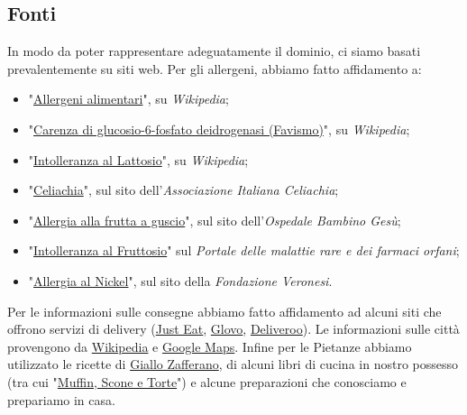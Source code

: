 \documentclass[12pt]{article}
\begin{document}
\subsection{Fonti}
In modo da poter rappresentare adeguatamente il dominio, ci siamo basati prevalentemente su siti web.\newline
Per gli allergeni, abbiamo fatto affidamento a:
\begin{itemize}
    \item "\href{https://it.wikipedia.org/wiki/Allergeni_alimentari}{Allergeni alimentari}", su \textit{Wikipedia};
    \item "\href{https://it.wikipedia.org/wiki/Carenza_di_glucosio-6-fosfato_deidrogenasi}{Carenza di glucosio-6-fosfato deidrogenasi (Favismo)}", su \textit{Wikipedia};
    \item "\href{https://it.wikipedia.org/wiki/Intolleranza_al_lattosio}{Intolleranza al Lattosio}", su \textit{Wikipedia};
    \item "\href{https://www.celiachia.it/}{Celiachia}", sul sito dell'\textit{Associazione Italiana Celiachia};
    \item "\href{http://www.ospedalebambinogesu.it/allergia-alla-frutta-a-guscio}{Allergia alla frutta a guscio}", sul sito dell'\textit{Ospedale Bambino Gesù};
    \item "\href{https://www.orpha.net/consor/cgi-bin/OC_Exp.php?lng=it&Expert=469}{Intolleranza al Fruttosio}" sul \textit{Portale delle malattie rare e dei farmaci orfani};
    \item "\href{https://www.fondazioneveronesi.it/magazine/articoli/lesperto-risponde/allergia-al-nichel-quali-precauzioni-prendere-cucina}{Allergia al Nickel}", sul sito della \textit{Fondazione Veronesi}.
\end{itemize}
Per le informazioni sulle consegne abbiamo fatto affidamento ad alcuni siti che offrono servizi di delivery (\href{https://www.justeat.it/}{Just Eat}, \href{https://glovoapp.com}{Glovo}, \href{https://deliveroo.it}{Deliveroo}).\newline
Le informazioni sulle città provengono da \href{https://it.wikipedia.org/}{Wikipedia} e \href{https://www.google.it/maps}{Google Maps}.\newline
Infine per le Pietanze abbiamo utilizzato le ricette di \href{https://www.giallozafferano.it/}{Giallo Zafferano}, di alcuni libri di cucina in nostro possesso (tra cui "\href{https://www.anobii.com/books/Muffin_scone_e_torte/9788880584278/01119011f24adbf79a}{Muffin, Scone e Torte}") e alcune preparazioni che conosciamo e prepariamo in casa.
\end{document}
